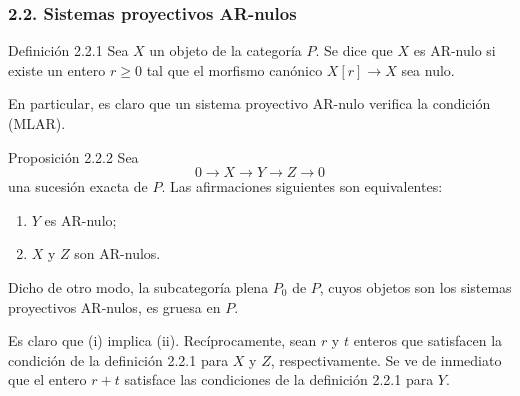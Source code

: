 \subsubsection*{2.2. Sistemas proyectivos AR-nulos}
\begin{statement}{Definición 2.2.1}
Sea $X$ un objeto de la categoría $P$. Se dice que $X$ es AR-nulo si existe un entero $r\ge0$ tal que el morfismo canónico $X[r]\to X$ sea nulo.
\end{statement}
En particular, es claro que un sistema proyectivo AR-nulo verifica la condición (MLAR).

\begin{statement}{Proposición 2.2.2}
Sea
\[
0\longrightarrow X\longrightarrow Y\longrightarrow Z\longrightarrow0
\]
una sucesión exacta de $P$. Las afirmaciones siguientes son equivalentes:
\begin{enumerate}[label=(\roman*)]
\item $Y$ es AR-nulo;
\item $X$ y $Z$ son AR-nulos.
\end{enumerate}
Dicho de otro modo, la subcategoría plena $P_0$ de $P$, cuyos objetos son los sistemas proyectivos AR-nulos, es gruesa en $P$.
\end{statement}

\begin{prooftext}[Demostración]
Es claro que (i) implica (ii). Recíprocamente, sean $r$ y $t$ enteros que satisfacen la condición de la definición 2.2.1 para $X$ y $Z$, respectivamente. Se ve de inmediato que el entero $r+t$ satisface las condiciones de la definición 2.2.1 para $Y$.
\end{prooftext}
